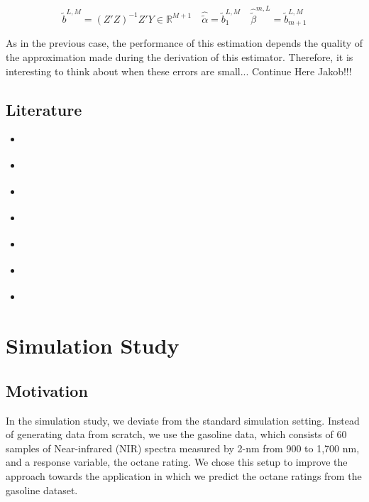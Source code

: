 \documentclass[11pt,twoside,a4paper]{article}
\begin{document}
	\begin{equation}
		\tilde{b}^{L,M} = \left(Z'Z\right)^{-1}Z'Y \in \mathbb{R}^{M+1} \quad \hat{\tilde{\alpha}} = \tilde{b}_{1}^{L,M} \quad \hat{\tilde{\beta}}^{m,L} = \tilde{b}^{L,M}_{m+1}
	\end{equation}

	As in the previous case, the performance of this estimation depends the quality of the approximation made during the derivation of this estimator. Therefore, it is interesting to think about when these errors are small... {\color{red}Continue Here Jakob!!!}

	\subsection{Literature}
	\begin{itemize}
		\item \cite{alexanderian_KLexpansion_2015}
		\item \cite{kokoszka_introduction_2017}
		\item \cite{hsing_theoretical_2015}
		\item \cite{ramsay_functional_2005}
		\item \cite{horvath_inference_2012}
		\item \cite{cai_prediction_2006}
		\item \cite{levitin_introduction_2007}
	\end{itemize}

	\section{Simulation Study}\label{Simulation}

	\subsection{Motivation}
	
	In the simulation study, we deviate from the standard simulation setting. Instead of generating data from scratch, we use the gasoline data, which consists of 60 samples of Near-infrared (NIR) spectra measured by 2-nm from 900 to 1,700 nm, and a response variable,  the octane rating. We chose this setup to improve the approach towards the application in which we  predict the octane ratings from the gasoline dataset.	
	
\end{document}
